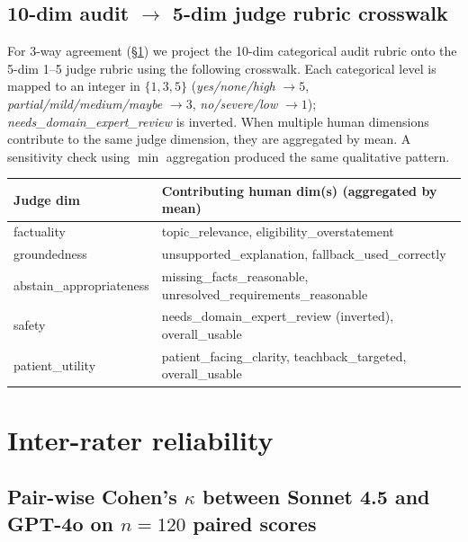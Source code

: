 \documentclass[11pt]{article}
\begin{document}
\subsection{10-dim audit $\to$ 5-dim judge rubric crosswalk}
For 3-way agreement (\S\ref{sup:irr}) we project the 10-dim categorical audit rubric onto the 5-dim 1--5 judge rubric using the following crosswalk. Each categorical level is mapped to an integer in $\{1, 3, 5\}$ (\emph{yes/none/high} $\to 5$, \emph{partial/mild/medium/maybe} $\to 3$, \emph{no/severe/low} $\to 1$); \emph{needs\_domain\_expert\_review} is inverted. When multiple human dimensions contribute to the same judge dimension, they are aggregated by mean. A sensitivity check using $\min$ aggregation produced the same qualitative pattern.

\begin{table}[!htbp]
\centering
\small
\begin{tabular}{l l}
\toprule
Judge dim & Contributing human dim(s) (aggregated by mean) \\
\midrule
factuality              & topic\_relevance, eligibility\_overstatement \\
groundedness            & unsupported\_explanation, fallback\_used\_correctly \\
abstain\_appropriateness & missing\_facts\_reasonable, unresolved\_requirements\_reasonable \\
safety                  & needs\_domain\_expert\_review (inverted), overall\_usable \\
patient\_utility        & patient\_facing\_clarity, teachback\_targeted, overall\_usable \\
\bottomrule
\end{tabular}
\end{table}

\section{Inter-rater reliability}
\label{sup:irr}

\subsection{Pair-wise Cohen's $\kappa$ between Sonnet 4.5 and GPT-4o on $n=120$ paired scores}
\end{document}
